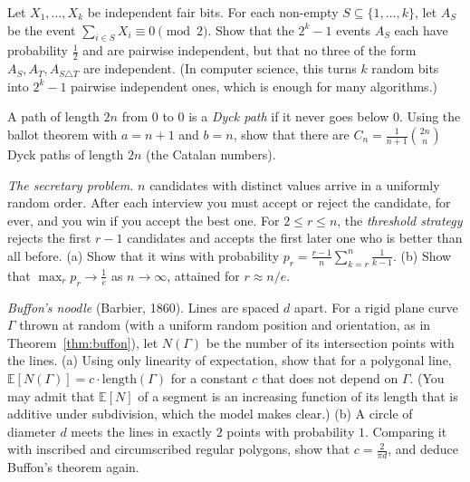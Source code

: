 \begin{exercise}[$\star\star$]\label{ex:pairwise}
Let $X_1,\dots,X_k$ be independent fair bits. For each non-empty $S\subseteq\{1,\dots,k\}$, let $A_S$ be the event
$\sum_{i\in S}X_i\equiv0\pmod2$. Show that the $2^k-1$ events $A_S$ each have probability $\frac12$ and are pairwise
independent, but that no three of the form $A_S,A_T,A_{S\triangle T}$ are independent. (In computer science, this
turns $k$ random bits into $2^k-1$ pairwise independent ones, which is enough for many algorithms.)
\end{exercise}

\begin{exercise}[$\star\star$]\label{ex:catalan}
A path of length $2n$ from $0$ to $0$ is a \emph{Dyck path} if it never goes below $0$. Using the ballot theorem
with $a=n+1$ and $b=n$, show that there are $C_n=\frac1{n+1}\binom{2n}n$ Dyck paths of length $2n$ (the Catalan
numbers).
\end{exercise}

\begin{exercise}[$\star\star$]\label{ex:secretary}
\emph{The secretary problem.} $n$ candidates with distinct values arrive in a uniformly random order. After each
interview you must accept or reject the candidate, for ever, and you win if you accept the best one. For
$2\le r\le n$, the \emph{threshold strategy} rejects the first $r-1$ candidates and accepts the first later one
who is better than all before. (a) Show that it wins with probability $p_r=\frac{r-1}n\sum_{k=r}^n\frac1{k-1}$.
(b) Show that $\max_rp_r\to\frac1e$ as $n\to\infty$, attained for $r\approx n/e$.
\end{exercise}

\begin{exercise}[$\star\star\star$]\label{ex:noodle}
\emph{Buffon's noodle} (Barbier, 1860). Lines are spaced $d$ apart. For a rigid plane curve $\Gamma$ thrown at
random (with a uniform random position and orientation, as in Theorem~\ref{thm:buffon}), let $N(\Gamma)$ be the
number of its intersection points with the lines.
(a) Using only linearity of expectation, show that for a polygonal line, $\mathbb E[N(\Gamma)]=c\cdot\text{length}(\Gamma)$
for a constant $c$ that does not depend on $\Gamma$. (You may admit that $\mathbb E[N]$ of a segment is
an increasing function of its length that is additive under subdivision, which the model makes clear.)
(b) A circle of diameter $d$ meets the lines in exactly $2$ points with probability $1$. Comparing it with
inscribed and circumscribed regular polygons, show that $c=\frac2{\pi d}$, and deduce Buffon's theorem again.
\end{exercise}

